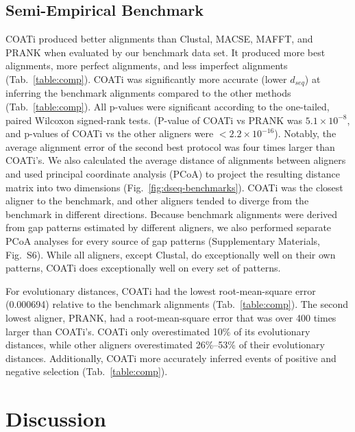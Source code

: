 \documentclass[12pt,letterpaper]{article}
\begin{document}
\subsection*{Semi-Empirical Benchmark}

COATi produced better alignments than Clustal\textOmega{}, MACSE, MAFFT, and PRANK when evaluated by our benchmark data set. It produced more best alignments, more perfect alignments, and less imperfect alignments (Tab.~\ref{table:comp}).
%
COATi was significantly more accurate (lower $d_{seq}$) at inferring the benchmark alignments compared to the other methods (Tab.~\ref{table:comp}). All p-values were significant according to the one-tailed, paired Wilcoxon signed-rank tests. (P-value of COATi vs PRANK was $5.1 \times 10^{-8}$, and p-values of COATi vs the other aligners were $< 2.2 \times 10^{-16}$). Notably, the average alignment error of the second best protocol was four times larger than COATi's. We also calculated the average distance of alignments between aligners and used principal coordinate analysis (PCoA) to project the resulting distance matrix into two dimensions (Fig.~\ref{fig:dseq-benchmarks}). COATi was the closest aligner to the benchmark, and other aligners tended to diverge from the benchmark in different directions. Because benchmark alignments were derived from gap patterns estimated by different aligners, we also performed separate PCoA analyses for every source of gap patterns (Supplementary Materials, Fig.~S6). While all aligners, except Clustal\textOmega{}, do exceptionally well on their own patterns, COATi does exceptionally well on every set of patterns.

For evolutionary distances, COATi had the lowest root-mean-square error (0.000694) relative to the benchmark alignments (Tab.~\ref{table:comp}). The second lowest aligner, PRANK, had a root-mean-square error that was over 400 times larger than COATi's. COATi only overestimated  10\% of its evolutionary distances, while other aligners overestimated 26\%--53\% of their evolutionary distances.
%
Additionally, COATi more accurately inferred events of positive and negative selection (Tab.~\ref{table:comp}).

\section*{Discussion}
\end{document}
